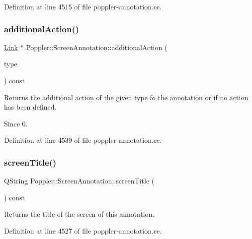 Definition at line 4515 of file poppler-\/annotation.\+cc.

\mbox{\label{class_poppler_1_1_screen_annotation_a55123502cb0672be387a6abeddf10b55}} 
\subsubsection{\texorpdfstring{additional\+Action()}{additionalAction()}}
{\footnotesize\ttfamily \hyperlink{class_poppler_1_1_link}{Link} $\ast$ Poppler\+::\+Screen\+Annotation\+::additional\+Action (\begin{DoxyParamCaption}\item[{\hyperlink{class_poppler_1_1_annotation_adab1fa85588b8f9fcdf20cdf37c1be97}{Additional\+Action\+Type}}]{type }\end{DoxyParamCaption}) const}

Returns the additional action of the given {\ttfamily type} fo the annotation or {} if no action has been defined.

\begin{DoxySince}{Since}
0. 
\end{DoxySince}


Definition at line 4539 of file poppler-\/annotation.\+cc.

\mbox{\label{class_poppler_1_1_screen_annotation_aefb1b8c92fa3c3ca3b2975282fd7cefa}} 
\subsubsection{\texorpdfstring{screen\+Title()}{screenTitle()}}
{\footnotesize\ttfamily Q\+String Poppler\+::\+Screen\+Annotation\+::screen\+Title (\begin{DoxyParamCaption}{ }\end{DoxyParamCaption}) const}

Returns the title of the screen of this annotation. 

Definition at line 4527 of file poppler-\/annotation.\+cc.

